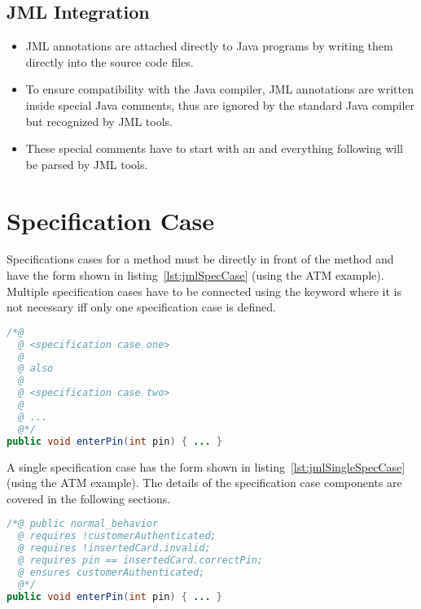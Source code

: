		\subsection{JML Integration}
			\begin{itemize}
				\item JML annotations are attached directly to Java programs by writing them directly into the source code files.
				\item To ensure compatibility with the Java compiler, JML annotations are written inside special Java comments, thus are ignored by the standard Java compiler but recognized by JML tools.
				\item These special comments have to start with an \texttt{\@} and everything following will be parsed by JML tools.
			\end{itemize}


	\section{Specification Case}
		Specifications cases for a method must be directly in front of the method and have the form shown in listing~\ref{lst:jmlSpecCase} (using the ATM example). Multiple specification cases have to be connected using the keyword  where it is not necessary iff only one specification case is defined.

		\begin{lstlisting}[caption = { Specification Cases in JML }, label = lst:jmlSpecCase, language = Java]
/*@
  @ <specification case one>
  @
  @ also
  @
  @ <specification case two>
  @
  @ ...
  @*/
public void enterPin(int pin) { ... }
		\end{lstlisting}

		A single specification case has the form shown in listing~\ref{lst:jmlSingleSpecCase} (using the ATM example). The details of the specification case components are covered in the following sections.

		\begin{lstlisting}[caption = { Single Specification Case in JML }, label = lst:jmlSingleSpecCase, language = Java]
/*@ public normal_behavior
  @ requires !customerAuthenticated;
  @ requires !insertedCard.invalid;
  @ requires pin == insertedCard.correctPin;
  @ ensures customerAuthenticated;
  @*/
public void enterPin(int pin) { ... }
		\end{lstlisting}

